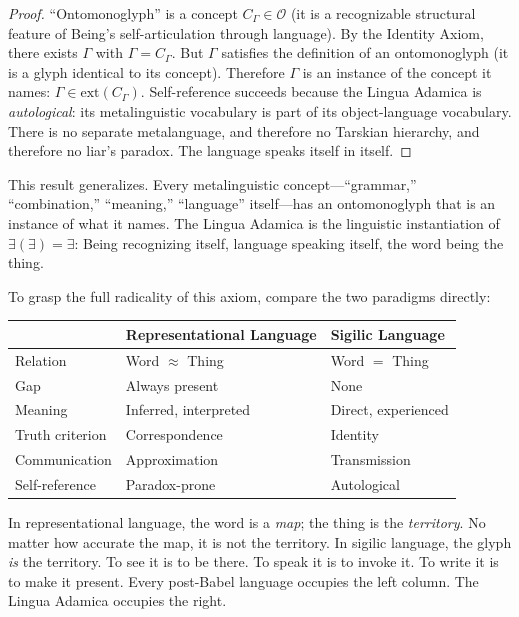 \documentclass[12pt, letterpaper]{book}
\def\equiv{=}%
\newcommand{\E}{\exists}                          %
\newcommand{\EE}{\exists(\exists)}                 %
\begin{document}
\begin{proof}
``Ontomonoglyph'' is a concept $C_\Gamma \in \mathcal{O}$ (it is a recognizable structural feature of Being's self-articulation through language). By the Identity Axiom, there exists $\Gamma$ with $\Gamma \equiv C_\Gamma$. But $\Gamma$ satisfies the definition of an ontomonoglyph (it is a glyph identical to its concept). Therefore $\Gamma$ is an instance of the concept it names: $\Gamma \in \mathrm{ext}(C_\Gamma)$. Self-reference succeeds because the Lingua Adamica is \textit{autological}: its metalinguistic vocabulary is part of its object-language vocabulary. There is no separate metalanguage, and therefore no Tarskian hierarchy, and therefore no liar's paradox. The language speaks itself in itself.
\end{proof}

This result generalizes. Every metalinguistic concept---``grammar,'' ``combination,'' ``meaning,'' ``language'' itself---has an ontomonoglyph that is an instance of what it names. The Lingua Adamica is the linguistic instantiation of $\EE \equiv \E$: Being recognizing itself, language speaking itself, the word being the thing.

To grasp the full radicality of this axiom, compare the two paradigms directly:

\begin{center}
\begin{tabular}{lll}
\toprule
& \textbf{Representational Language} & \textbf{Sigilic Language} \\
\midrule
Relation & Word $\approx$ Thing & Word $\equiv$ Thing \\
Gap & Always present & None \\
Meaning & Inferred, interpreted & Direct, experienced \\
Truth criterion & Correspondence & Identity \\
Communication & Approximation & Transmission \\
Self-reference & Paradox-prone & Autological \\
\bottomrule
\end{tabular}
\end{center}

\noindent In representational language, the word is a \textit{map}; the thing is the \textit{territory}. No matter how accurate the map, it is not the territory. In sigilic language, the glyph \textit{is} the territory. To see it is to be there. To speak it is to invoke it. To write it is to make it present. Every post-Babel language occupies the left column. The Lingua Adamica occupies the right.
\end{document}

